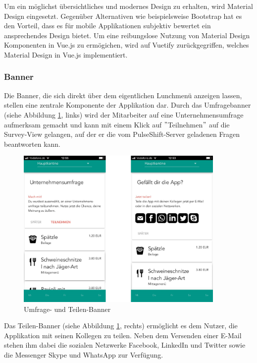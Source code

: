 Um ein möglichst übersichtliches und modernes Design zu erhalten, wird Material Design eingesetzt. Gegenüber Alternativen wie beispielsweise Bootstrap hat es den Vorteil, dass es für mobile Applikationen subjektiv bewertet ein ansprechendes Design bietet. Um eine reibungslose Nutzung von Material Design Komponenten in Vue.js zu ermögichen, wird auf Vuetify zurückgegriffen, welches Material Design in Vue.js implementiert.

\subsubsection{Banner}

Die Banner, die sich direkt über dem eigentlichen Lunchmenü anzeigen lassen, stellen eine zentrale Komponente der Applikation dar. Durch das Umfragebanner (siehe Abbildung \ref{fig:banners}, links) wird der Mitarbeiter auf eine Unternehmensumfrage aufmerksam gemacht und kann mit einem Klick auf $"$Teilnehmen$"$ auf die Survey-View gelangen, auf der er die vom PulseShift-Server geladenen Fragen beantworten kann.

\begin{figure}[H]
\centering
\includegraphics[width=0.9\textwidth]{images/banners}
\caption[Umfrage- und Teilen-Banner]{Umfrage- und Teilen-Banner}
\label{fig:banners}
\end{figure}

Das Teilen-Banner (siehe Abbildung \ref{fig:banners}, rechts) ermöglicht es dem Nutzer, die Applikation mit seinen Kollegen zu teilen. Neben dem Versenden einer E-Mail stehen ihm dabei die sozialen Netzwerke Facebook, LinkedIn und Twitter sowie die Messenger Skype und WhatsApp zur Verfügung.

